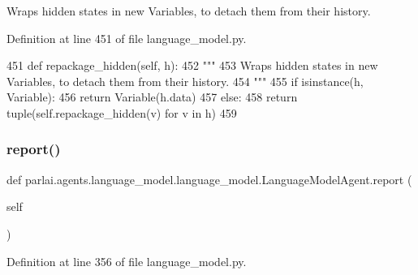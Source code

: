 \begin{DoxyVerb}Wraps hidden states in new Variables, to detach them from their history.
\end{DoxyVerb}
 

Definition at line 451 of file language\+\_\+model.\+py.


\begin{DoxyCode}
451     \textcolor{keyword}{def }repackage\_hidden(self, h):
452         \textcolor{stringliteral}{"""}
453 \textcolor{stringliteral}{        Wraps hidden states in new Variables, to detach them from their history.}
454 \textcolor{stringliteral}{        """}
455         \textcolor{keywordflow}{if} isinstance(h, Variable):
456             \textcolor{keywordflow}{return} Variable(h.data)
457         \textcolor{keywordflow}{else}:
458             \textcolor{keywordflow}{return} tuple(self.repackage\_hidden(v) \textcolor{keywordflow}{for} v \textcolor{keywordflow}{in} h)
459 
\end{DoxyCode}
\mbox{\label{classparlai_1_1agents_1_1language__model_1_1language__model_1_1LanguageModelAgent_acc05a1253c9fc32f8d1f9817b9ca559e}} 
\subsubsection{\texorpdfstring{report()}{report()}}
{\footnotesize\ttfamily def parlai.\+agents.\+language\+\_\+model.\+language\+\_\+model.\+Language\+Model\+Agent.\+report (\begin{DoxyParamCaption}\item[{}]{self }\end{DoxyParamCaption})}



Definition at line 356 of file language\+\_\+model.\+py.


